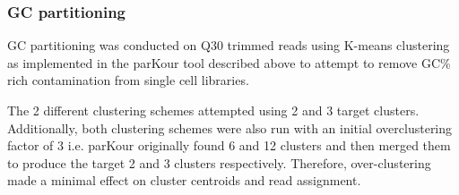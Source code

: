 \begin{table}
    \centering

    \caption[Library Sizes After Trimming]{Summary of the library size of the taxonomically selected single cell 
        libraries before and after trimming at a minimum average SLIDINGWINDOW quality 
        threshold of Q30. Of interest, Dark1-2 was generally of poor quality and thus 
        was disproportionately minimised by trimming. Additionally, the 
        two bulk RNAseq libraries were trimmed at Q20 in FastQ-MCF resulting in 
    total library sizes of \(2.458*10^{7}\) and \(2.779*10^{7}\) respectively}
\end{table}

\subsubsection{GC partitioning} 

GC partitioning was conducted on Q30 trimmed reads 
using K-means clustering as implemented in the parKour tool described above 
to attempt to remove GC\% rich contamination from single cell libraries.

The 2 different clustering schemes attempted using 2 and 3 target clusters.
Additionally, both clustering schemes were also run with an initial overclustering factor of 3
i.e. parKour originally found 6 and 12 clusters and then merged them to produce the target 2 and 3 
clusters respectively. Therefore, over-clustering made a minimal effect on cluster centroids and read assignment.

